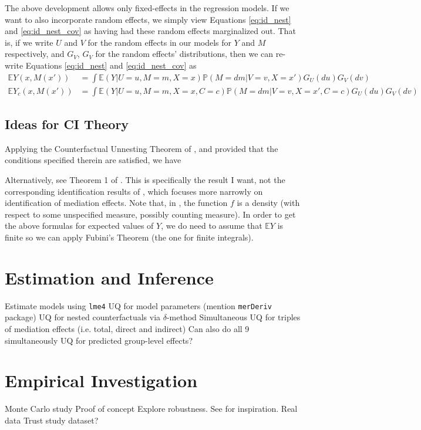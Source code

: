 \documentclass{article}
\newcommand{\bP}{\mathbb{P}}
\newcommand{\bE}{\mathbb{E}}
\begin{document}
The above development allows only fixed-effects in the regression models. If we want to also incorporate random effects, we simply view Equations \ref{eq:id_nest} and \ref{eq:id_nest_cov} as having had these random effects marginalized out. That is, if we write $U$ and $V$ for the random effects in our models for $Y$ and $M$ respectively, and $G_V$, $G_V$ for the random effects' distributions, then we can re-write Equations \ref{eq:id_nest} and \ref{eq:id_nest_cov} as
%
\begin{align}
    \bE Y(x, M(x')) &= \int \bE(Y | U=u, M=m, X=x) \bP(M = dm |V=v, X = x') G_U(du) G_V(dv) \label{eq:ran_id_nest} \\
    \bE Y_c(x, M(x')) &= \int \bE(Y | U=u, M=m, X=x, C=c) \bP(M = dm | V=v, X = x', C=c) G_U(du) G_V(dv) \label{eq:ran_id_nest_cov}
\end{align}

\subsection{Ideas for CI Theory}
Applying the Counterfactual Unnesting Theorem of \citet{Cor21}, and provided that the conditions specified therein are satisfied, we have

Alternatively, see Theorem 1 of \citet{Ima10I}. This is specifically the result I want, not the corresponding identification results of \citet{Ima10II}, which focuses more narrowly on identification of mediation effects. Note that, in \citet{Ima10I}, the function $f$ is a density (with respect to some unspecified measure, possibly counting measure). In order to get the above formulas for expected values of $Y$, we do need to assume that $\bE Y$ is finite so we can apply Fubini's Theorem (the one for finite integrals).






\section{Estimation and Inference}

\begin{outline}
    \1 Estimate models using \texttt{lme4}
    \1 UQ for model parameters (mention \texttt{merDeriv} package)
    \1 UQ for nested counterfactuals via $\delta$-method
    \1 Simultaneous UQ for triples of mediation effects (i.e. total, direct and indirect)
        \2 Can also do all 9 simultaneously
    \1 UQ for predicted group-level effects?
\end{outline}


\section{Empirical Investigation}

\begin{outline}
    \1 Monte Carlo study
        \2 Proof of concept
        \2 Explore robustness. See \citet{Sam23} for inspiration.
    \1 Real data
        \2 Trust study dataset?
\end{outline}


\end{document}
